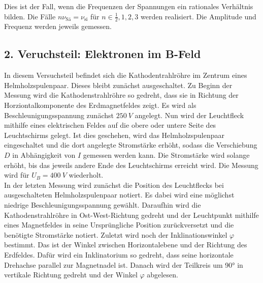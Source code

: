   Dies ist der Fall, wenn die Frequenzen der Spannungen ein rationales Verhältnis bilden.
  Die Fälle $n \nu_\text{Sä}=\nu_\text{si}$ für $n \in {\frac{1}{2}, 1, 2, 3}$ werden realisiert.
  Die Amplitude und Frequenz werden jeweils gemessen.

\subsection{2. Veruchsteil: Elektronen im B-Feld}

  In diesem Versuchsteil befindet sich die Kathodentrahlröhre im Zentrum eines Helmholzspulenpaar. Dieses bleibt zunächst ausgeschaltet.
  Zu Beginn der Messung wird die Kathodenstrahlröhre so gedreht, dass sie in Richtung der Horziontalkomponente des Erdmagnetfeldes zeigt.
  Es wird als Beschleunigungsspannung zunächst $\SI{250}{V}$ angelegt.
  Nun wird der Leuchtfleck mithilfe eines elektrischen Feldes auf die obere oder untere Seite des Leuchtschirms gelegt.
  Ist dies geschehen, wird das Helmholzspulenpaar eingeschaltet und die dort angelegte Stromstärke erhöht, sodass die Verschiebung
  $D$ in Abhängigkeit von $I$ gemessen werden kann. Die Stromstärke wird solange erhöht, bis das jeweils andere Ende des Leuchtschirms erreicht wird.
  Die Messung wird für $U_B= \SI{400}{V}$ wiederholt.
\\
  In der letzten Messung wird zunächst die Position des Leuchtflecks bei ausgeschalteten Helmholzspulenpaar notiert.
  Es dabei wird eine möglichst niedrige Beschleunigungsspannung gewählt.
  Daraufhin wird die Kathodenstrahlröhre in Ost-West-Richtung gedreht  und der Leuchtpunkt mithilfe eines Magnetfeldes in seine Ursprüngliche Position
  zurückversetzt und die benötigte Stromstärke notiert.
  Zuletzt wird noch der Inklinationswinkel $\varphi$ bestimmt. Das ist der Winkel zwischen Horizontalebene und der Richtung
  des Erdfeldes.
  Dafür wird ein Inklinatorium so gedreht, dass seine horizontale Drehachse parallel zur Magnetnadel ist.
  Danach wird der Teilkreis um 90° in vertikale Richtung gedreht und der Winkel $\varphi$ abgelesen.
